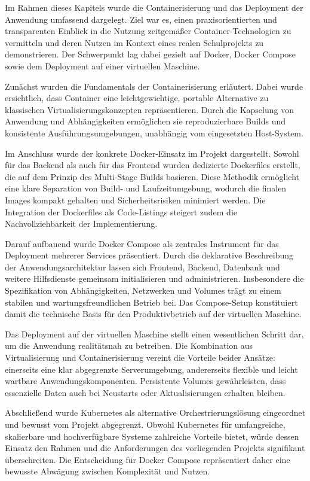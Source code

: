 \label{sec:docker-summary}

Im Rahmen dieses Kapitels wurde die Containerisierung und das Deployment der
Anwendung umfassend dargelegt. Ziel war es, einen praxisorientierten und
transparenten Einblick in die Nutzung zeitgemäßer Container-Technologien zu
vermitteln und deren Nutzen im Kontext eines realen Schulprojekts zu
demonstrieren. Der Schwerpunkt lag dabei gezielt auf Docker, Docker Compose sowie
dem Deployment auf einer virtuellen Maschine.

Zunächst wurden die Fundamentals der Containerisierung erläutert. Dabei wurde
ersichtlich, dass Container eine leichtgewichtige, portable Alternative zu
klassischen Virtualisierungskonzepten repräsentieren. Durch die Kapselung von
Anwendung und Abhängigkeiten ermöglichen sie reproduzierbare Builds und
konsistente Ausführungsumgebungen, unabhängig vom eingesetzten Host-System.

Im Anschluss wurde der konkrete Docker-Einsatz im Projekt dargestellt. Sowohl
für das Backend als auch für das Frontend wurden dedizierte Dockerfiles erstellt,
die auf dem Prinzip des Multi-Stage Builds basieren. Diese Methodik ermöglicht
eine klare Separation von Build- und Laufzeitumgebung, wodurch die finalen Images
kompakt gehalten und Sicherheitsrisiken minimiert werden. Die Integration der
Dockerfiles als Code-Listings steigert zudem die Nachvollziehbarkeit der
Implementierung.

Darauf aufbauend wurde Docker Compose als zentrales Instrument für das Deployment
mehrerer Services präsentiert. Durch die deklarative Beschreibung der
Anwendungsarchitektur lassen sich Frontend, Backend, Datenbank und weitere
Hilfsdienste gemeinsam initialisieren und administrieren. Insbesondere die
Spezifikation von Abhängigkeiten, Netzwerken und Volumes trägt zu einem stabilen
und wartungsfreundlichen Betrieb bei. Das Compose-Setup konstituiert damit die
technische Basis für den Produktivbetrieb auf der virtuellen Maschine.

Das Deployment auf der virtuellen Maschine stellt einen wesentlichen Schritt dar,
um die Anwendung realitätsnah zu betreiben. Die Kombination aus Virtualisierung
und Containerisierung vereint die Vorteile beider Ansätze: einerseits eine
klar abgegrenzte Serverumgebung, andererseits flexible und leicht wartbare
Anwendungskomponenten. Persistente Volumes gewährleisten, dass essenzielle Daten
auch bei Neustarts oder Aktualisierungen erhalten bleiben.

Abschließend wurde Kubernetes als alternative Orchestrierungslösung eingeordnet
und bewusst vom Projekt abgegrenzt. Obwohl Kubernetes für umfangreiche, skalierbare
und hochverfügbare Systeme zahlreiche Vorteile bietet, würde dessen Einsatz den
Rahmen und die Anforderungen des vorliegenden Projekts signifikant überschreiten.
Die Entscheidung für Docker Compose repräsentiert daher eine bewusste Abwägung
zwischen Komplexität und Nutzen.

